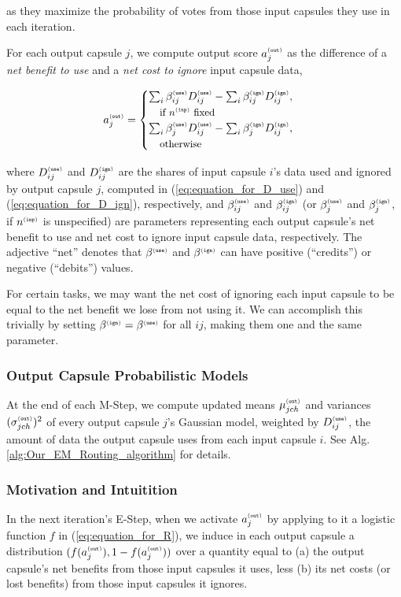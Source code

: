 \documentclass[11pt,a4paper]{article}
\newcommand{\suptag}[1]{^{{\scriptscriptstyle\tt (#1)}}}
\newcommand{\showeqfora}[1]{
	\begin{cases}
		\sum_i \beta\suptag{use}_{ij} D\suptag{use}_{ij} - 
		\sum_i \beta\suptag{ign}_{ij} D\suptag{ign}_{ij},
		#1 \text{\small if $n\inp$ fixed} \\
		
		\sum_i \beta\suptag{use}_j D\suptag{use}_{ij} -
		\sum_i \beta\suptag{ign}_j D\suptag{ign}_{ij},
		#1 \text{\small otherwise}
	\end{cases}
}
\begin{document}
as they maximize the probability of votes from those input capsules they use in each iteration.

For each output capsule $j$, we compute output score $a\out_j$ as the difference of a \emph{net benefit to use} and a \emph{net cost to ignore} input capsule data,

\begin{equation}\label{eq:equation_for_a}
a\out_j = \showeqfora{\\ \quad}
\end{equation}

where $D\suptag{use}_{ij}$ and $D\suptag{ign}_{ij}$ are the shares of input capsule $i$'s data used and ignored by output capsule $j$, computed in (\ref{eq:equation_for_D_use}) and (\ref{eq:equation_for_D_ign}), respectively, and $\beta\suptag{use}_{ij}$ and $\beta\suptag{ign}_{ij}$ (or $\beta\suptag{use}_j$ and $\beta\suptag{ign}_j$, if $n\inp$ is unspecified) are parameters representing each output capsule's net benefit to use and net cost to ignore input capsule data, respectively. The adjective ``net'' denotes  that $\beta\suptag{use}$ and $\beta\suptag{ign}$ can have positive (``credits'') or negative (``debits'') values.

For certain tasks, we may want the net cost of ignoring each input capsule to be equal to the net benefit we lose from not using it. We can accomplish this trivially by setting $\beta\suptag{ign} = \beta\suptag{use}$ for all $ij$, making them one and the same parameter.

\subsubsection{Output Capsule Probabilistic Models}

At the end of each M-Step, we compute updated means $\mu\out_{jch}$ and variances $(\sigma\out_{jch})^2$ of every output capsule $j$'s Gaussian model, weighted by $D\suptag{use}_{ij}$, the amount of data the output capsule uses from each input capsule $i$. See Alg. \ref{alg:Our_EM_Routing_algorithm} for details.

\subsubsection{Motivation and Intuitition}

In the next iteration's E-Step, when we activate $a\out_j$ by applying to it a logistic function $f$ in (\ref{eq:equation_for_R}), we induce in each output capsule a distribution $(f(a\out_j), 1 - f(a\out_j))$ over a quantity equal to (a) the output capsule's net benefits from those input capsules it uses, less (b) its net costs (or lost benefits) from those input capsules it ignores.
\end{document}
